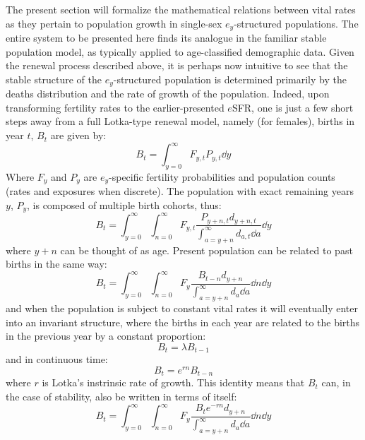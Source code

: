  \FloatBarrier
The present section will formalize the mathematical relations between vital
rates as they pertain to population growth in single-sex $e_y$-structured
populations. The entire system to be presented here finds its analogue in the
familiar stable population model, as typically applied to age-classified
demographic data. Given the renewal process described above, it is perhaps now
intuitive to see that the stable structure of the $e_y$-structured population is determined
primarily by the deaths distribution and the rate of growth of the
population. Indeed, upon transforming fertility rates to the earlier-presented
$e$SFR, one is just a few short steps away from a full Lotka-type renewal
model, namely (for females), births in year $t$, $B_{t}$ are given by:
\begin{equation}
B_t = \int_{y=0}^\infty F_{y,t} P_{y,t} \dd y
\end{equation}
Where $F_y$ and $P_y$ are $e_y$-specific fertility probabilities and population
counts (rates and exposures when discrete). The population with
exact remaining years $y$, $P_y$, is composed of multiple birth cohorts, thus:
\begin{equation}
B_t = \int_{y=0}^\infty \int_{n=0}^\infty F_{y,t}
\frac{P_{y+n,t}d_{y+n,t}}{\int_{a=y+n}^\infty d_{a,t} \dd a} \dd y
\end{equation}
where $y+n$ can be thought of as age. Present population can be related to past
births in the same way:
\begin{equation}
B_t = \int_{y=0}^\infty \int_{n=0}^\infty F_y
\frac{B_{t-n}d_{y+n}}{\int_{a=y+n}^\infty d_a \dd a} \dd n \dd y
\end{equation}
and when the population is subject to constant vital rates it will eventually
enter into an invariant structure, where the births in each year are related to
the births in the previous year by a constant proportion:
\begin{equation}
B_t = \lambda B_{t-1}
\end{equation}
and in continuous time:
\begin{equation}
B_t = e^{rn}B_{t-n}
\end{equation}
where $r$ is Lotka's instrinsic rate of growth. This identity means that $B_t$
can, in the case of stability, also be written in terms of itself:
\begin{equation}
\label{eq:exrenewal1sex}
B_t = \int_{y=0}^\infty \int_{n=0}^\infty F_y
\frac{B_{t}e^{-rn}d_{y+n}}{\int_{a=y+n}^\infty d_a \dd a} \dd n \dd y
\end{equation}
